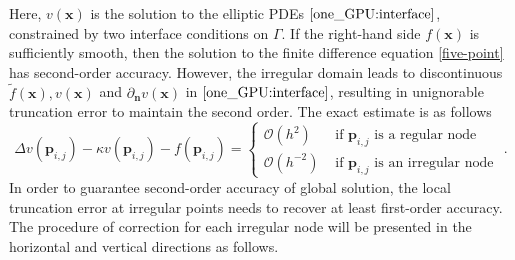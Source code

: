 Here, $v(\mathbf{x})$ is the solution to the elliptic PDEs $\eqref{one_GPU:interface}$, constrained by two interface conditions on $\Gamma$. If the right-hand side  $f(\mathbf{x})$ is sufficiently smooth, then the solution to the finite difference equation \eqref{five-point} has second-order accuracy. However, the irregular domain leads to discontinuous $\tilde{f}(\mathbf{x}), v(\mathbf{x})$ and $\partial_{\mathbf{n}}v(\mathbf{x})$ in $\eqref{one_GPU:interface}$, resulting in unignorable truncation error to maintain the second order. 
The exact estimate is as follows
$$
\Delta v(\mathbf{p}_{i,j})-\kappa v(\mathbf{p}_{i,j}) - f(\mathbf{p}_{i,j})=\begin{cases}\mathcal{O}\left(h^{2}\right) & \text { if }\mathbf{p}_{i,j} \text { is a regular node } \\ \mathcal{O}\left(h^{-2}\right) & \text { if }\mathbf{p}_{i,j} \text { is an irregular node }\end{cases}.
$$
 In order to guarantee second-order accuracy of global solution, the local truncation error at irregular points needs to recover at least first-order accuracy\cite{On2008Beale}. The procedure of correction for each irregular node will be presented in the horizontal and vertical directions as follows. 

